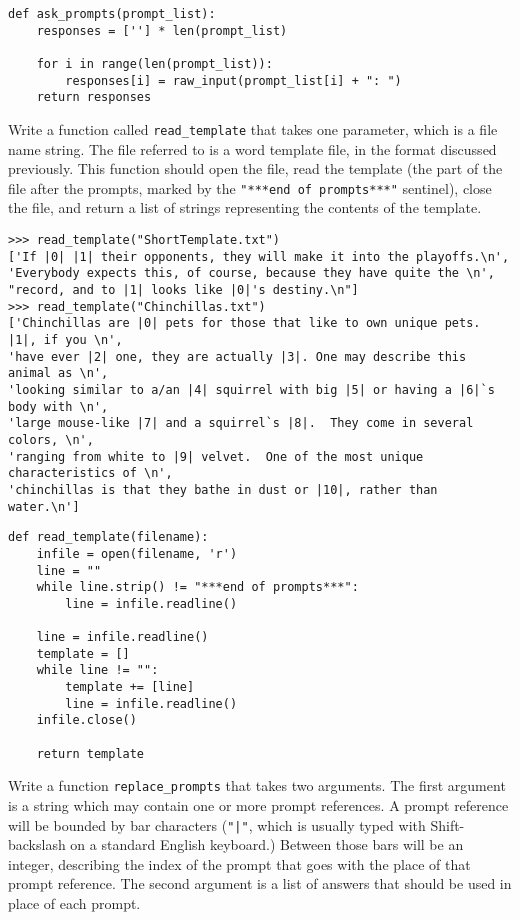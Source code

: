 \documentclass[10pt,answers]{exam}
\begin{document}
\begin{questions}
\begin{solution}
\begin{lstlisting}
def ask_prompts(prompt_list):
    responses = [''] * len(prompt_list)

    for i in range(len(prompt_list)):
        responses[i] = raw_input(prompt_list[i] + ": ")
    return responses
\end{lstlisting}
\end{solution}

\question Write a function called \lstinline{read_template} that takes one parameter, which is a file name string.  The file referred to 
is a word template file, in the format discussed previously. 
This function should open the file, read the template (the part of the file after the prompts, marked by the 
\lstinline{"***end of prompts***"} sentinel), close the file, and return a list of 
strings representing the contents of the template.

\begin{lstlisting}
>>> read_template("ShortTemplate.txt")
['If |0| |1| their opponents, they will make it into the playoffs.\n', 
'Everybody expects this, of course, because they have quite the \n', 
"record, and to |1| looks like |0|'s destiny.\n"]
>>> read_template("Chinchillas.txt")
['Chinchillas are |0| pets for those that like to own unique pets. |1|, if you \n',
'have ever |2| one, they are actually |3|. One may describe this animal as \n', 
'looking similar to a/an |4| squirrel with big |5| or having a |6|`s body with \n', 
'large mouse-like |7| and a squirrel`s |8|.  They come in several colors, \n', 
'ranging from white to |9| velvet.  One of the most unique characteristics of \n', 
'chinchillas is that they bathe in dust or |10|, rather than water.\n']
\end{lstlisting}

\begin{solution}
\begin{lstlisting}
def read_template(filename):
    infile = open(filename, 'r')
    line = ""
    while line.strip() != "***end of prompts***":
        line = infile.readline()

    line = infile.readline()
    template = []
    while line != "":
        template += [line]
        line = infile.readline()
    infile.close()

    return template
\end{lstlisting}
\end{solution}

\question Write a function \lstinline{replace_prompts} that takes two arguments.  The first 
argument is a string which may contain one or more prompt references.  A prompt reference will 
be bounded by bar characters (\lstinline{"|"}, which is usually typed with Shift-backslash on 
a standard English keyboard.)  Between those bars will be an integer, describing the index of the 
prompt that goes with the place of that prompt reference.  The second argument is a list of 
answers that should be used in place of each prompt.


\end{questions}
\end{document}
